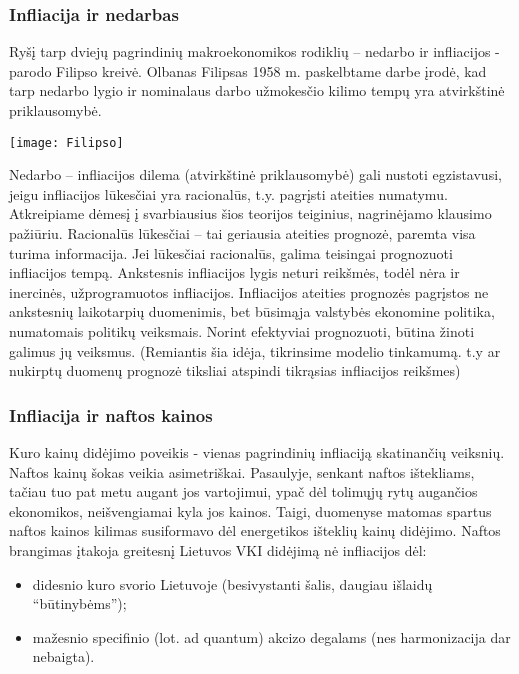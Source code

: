 \documentclass[a4paper]{article}
\begin{document}
\newpage \subsubsection{Infliacija ir nedarbas} \indent

Ryšį tarp dviejų pagrindinių makroekonomikos rodiklių – nedarbo ir infliacijos - parodo Filipso kreivė. Olbanas Filipsas 1958 m. paskelbtame darbe įrodė, kad tarp nedarbo lygio ir nominalaus darbo užmokesčio kilimo tempų yra atvirkštinė priklausomybė.

\begin{center} \texttt{[image: Filipso]} \end{center}

Nedarbo – infliacijos dilema (atvirkštinė priklausomybė) gali nustoti egzistavusi, jeigu infliacijos lūkesčiai yra racionalūs, t.y. pagrįsti ateities numatymu. Atkreipiame dėmesį į svarbiausius šios teorijos teiginius, nagrinėjamo klausimo pažiūriu. Racionalūs lūkesčiai – tai geriausia ateities prognozė, paremta visa turima informacija. Jei lūkesčiai racionalūs, galima teisingai prognozuoti infliacijos tempą. Ankstesnis infliacijos lygis neturi reikšmės, todėl nėra ir inercinės, užprogramuotos infliacijos. Infliacijos ateities prognozės pagrįstos ne ankstesnių laikotarpių duomenimis, bet būsimąja valstybės ekonomine politika, numatomais politikų veiksmais. Norint efektyviai prognozuoti, būtina žinoti galimus jų veiksmus. (Remiantis šia idėja, tikrinsime modelio tinkamumą. t.y ar nukirptų duomenų prognozė tiksliai atspindi tikrąsias infliacijos reikšmes)

\newpage \subsubsection{Infliacija ir naftos kainos} \indent

Kuro kainų didėjimo poveikis - vienas pagrindinių infliaciją skatinančių veiksnių. Naftos kainų šokas veikia asimetriškai. Pasaulyje, senkant naftos ištekliams, tačiau tuo pat metu augant jos vartojimui, ypač dėl tolimųjų rytų augančios ekonomikos, neišvengiamai kyla jos kainos. Taigi, duomenyse matomas spartus naftos kainos kilimas susiformavo dėl energetikos išteklių kainų didėjimo. Naftos brangimas įtakoja greitesnį Lietuvos VKI didėjimą nė infliacijos dėl:

\begin{itemize}
\item didesnio kuro svorio Lietuvoje (besivystanti šalis, daugiau išlaidų “būtinybėms”);
\item mažesnio specifinio (lot. ad quantum) akcizo degalams (nes harmonizacija dar nebaigta).
\end{itemize}
\newpage
\end{document}
